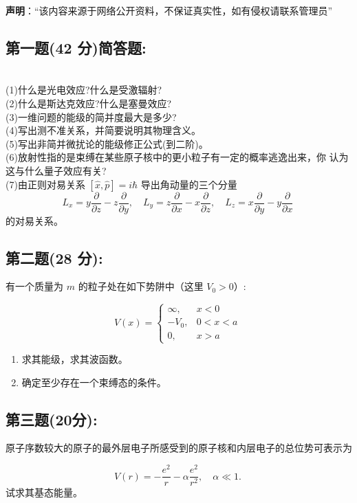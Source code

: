 
\textbf{声明}：“该内容来源于网络公开资料，不保证真实性，如有侵权请联系管理员”

\subsection{第一题(42 分)简答题:}\\
(1)什么是光电效应?什么是受激辐射?\\
(2)什么是斯达克效应?什么是塞曼效应?\\
(3)一维问题的能级的简并度最大是多少?\\
(4)写出测不准关系，并简要说明其物理含义。\\
(5)写出非简并微扰论的能级修正公式(到二阶)。\\
(6)放射性指的是束缚在某些原子核中的更小粒子有一定的概率逃逸出来，你
认为这与什么量子效应有关?\\
(7)由正则对易关系 $[\hat{x}, \hat{p}] = i\hbar$ 导出角动量的三个分量
\[
L_x = y \frac{\partial}{\partial z} - z \frac{\partial}{\partial y}, \quad 
L_y = z \frac{\partial}{\partial x} - x \frac{\partial}{\partial z}, \quad 
L_z = x \frac{\partial}{\partial y} - y \frac{\partial}{\partial x}~
\]
的对易关系。

\subsection{第二题(28 分):}
有一个质量为 $m$ 的粒子处在如下势阱中（这里 $V_0 > 0$）:

\[
V(x) =
\begin{cases}
\infty, & x < 0 \\
-V_0, & 0 < x < a \\
0, & x > a
\end{cases}~
\]

\begin{enumerate}
    \item  求其能级，求其波函数。
    \item  确定至少存在一个束缚态的条件。
\end{enumerate}
\subsection{第三题(20分):}
原子序数较大的原子的最外层电子所感受到的原子核和内层电子的总位势可表示为

\[
V(r) = -\frac{e^2}{r} - \alpha \frac{e^2}{r^2}, \quad \alpha \ll 1.~
\]
试求其基态能量。

